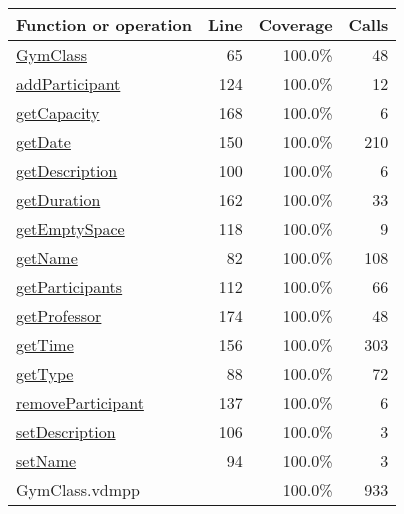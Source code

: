 \bigskip
\begin{longtable}{|l|r|r|r|}
\hline
Function or operation & Line & Coverage & Calls \\
\hline
\hline
\hyperref[GymClass:65]{GymClass} & 65&100.0\% & 48 \\
\hline
\hyperref[addParticipant:124]{addParticipant} & 124&100.0\% & 12 \\
\hline
\hyperref[getCapacity:168]{getCapacity} & 168&100.0\% & 6 \\
\hline
\hyperref[getDate:150]{getDate} & 150&100.0\% & 210 \\
\hline
\hyperref[getDescription:100]{getDescription} & 100&100.0\% & 6 \\
\hline
\hyperref[getDuration:162]{getDuration} & 162&100.0\% & 33 \\
\hline
\hyperref[getEmptySpace:118]{getEmptySpace} & 118&100.0\% & 9 \\
\hline
\hyperref[getName:82]{getName} & 82&100.0\% & 108 \\
\hline
\hyperref[getParticipants:112]{getParticipants} & 112&100.0\% & 66 \\
\hline
\hyperref[getProfessor:174]{getProfessor} & 174&100.0\% & 48 \\
\hline
\hyperref[getTime:156]{getTime} & 156&100.0\% & 303 \\
\hline
\hyperref[getType:88]{getType} & 88&100.0\% & 72 \\
\hline
\hyperref[removeParticipant:137]{removeParticipant} & 137&100.0\% & 6 \\
\hline
\hyperref[setDescription:106]{setDescription} & 106&100.0\% & 3 \\
\hline
\hyperref[setName:94]{setName} & 94&100.0\% & 3 \\
\hline
\hline
GymClass.vdmpp & & 100.0\% & 933 \\
\hline
\end{longtable}

